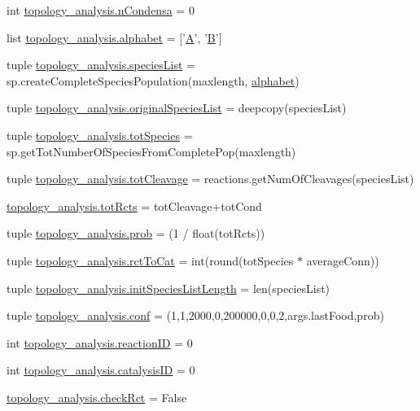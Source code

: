 \begin{DoxyCompactItemize}
\item 
int \hyperlink{a00157_a38aa665f11207bbd8cd2da4c382d4aca}{topology\-\_\-analysis.\-n\-Condensa} = 0
\item 
list \hyperlink{a00157_ab0d9c13eee214bf78b20760bf2835248}{topology\-\_\-analysis.\-alphabet} = \mbox{[}'\hyperlink{a00111_ab4f8a2431d9ad6efec44b47971737c52}{A}', '\hyperlink{a00111_afb39b9efa52a33745c5e622fa358a97f}{B}'\mbox{]}
\item 
tuple \hyperlink{a00157_a5bfc4cfa78ac777159cb0ca9c9c5c2f6}{topology\-\_\-analysis.\-species\-List} = sp.\-create\-Complete\-Species\-Population(maxlength, \hyperlink{a00113_abcbc32fc68e4323620d6171a17310212}{alphabet})
\item 
tuple \hyperlink{a00157_a62b034cfe14eff36f09dd65a51ae7c9c}{topology\-\_\-analysis.\-original\-Species\-List} = deepcopy(species\-List)
\item 
tuple \hyperlink{a00157_ac657414359bc072005d43b2328119a7d}{topology\-\_\-analysis.\-tot\-Species} = sp.\-get\-Tot\-Number\-Of\-Species\-From\-Complete\-Pop(maxlength)
\item 
tuple \hyperlink{a00157_a1e875e49e1f980d461a398fd6a072b0b}{topology\-\_\-analysis.\-tot\-Cleavage} = reactions.\-get\-Num\-Of\-Cleavages(species\-List)
\item 
\hyperlink{a00157_a059c41eb160321f87ba469fddd20eda7}{topology\-\_\-analysis.\-tot\-Rcts} = tot\-Cleavage+tot\-Cond
\item 
tuple \hyperlink{a00157_aad2c05e3d2146196ed236911dd796f6e}{topology\-\_\-analysis.\-prob} = (1 / float(tot\-Rcts))
\item 
tuple \hyperlink{a00157_afa804d4b1d39a63de9f14e5ab379ae34}{topology\-\_\-analysis.\-rct\-To\-Cat} = int(round(tot\-Species $\ast$ average\-Conn))
\item 
tuple \hyperlink{a00157_af2370a811b14632a793a28e451be8150}{topology\-\_\-analysis.\-init\-Species\-List\-Length} = len(species\-List)
\item 
tuple \hyperlink{a00157_aa468c4ff92202c7d89fb631e8cb54dc8}{topology\-\_\-analysis.\-conf} = (1,1,2000,0,200000,0,0,2,args.\-last\-Food,prob)
\item 
int \hyperlink{a00157_a07d632b487fabd051ab725ee95a85368}{topology\-\_\-analysis.\-reaction\-I\-D} = 0
\item 
int \hyperlink{a00157_a35953bf84aa0f7a2a3ffa3f68190c0fa}{topology\-\_\-analysis.\-catalysis\-I\-D} = 0
\item 
\hyperlink{a00157_a6f49caf3b9250cab918ae8dc5aef9931}{topology\-\_\-analysis.\-check\-Rct} = False

\end{DoxyCompactItemize}
